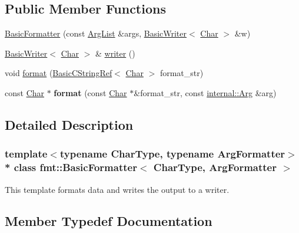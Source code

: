 \subsection*{Public Member Functions}
\begin{DoxyCompactItemize}
\item 
\hyperlink{classfmt_1_1BasicFormatter_a2b190901681ff0413dc60522fe158fdc}{Basic\+Formatter} (const \hyperlink{classfmt_1_1ArgList}{Arg\+List} \&args, \hyperlink{classfmt_1_1BasicWriter}{Basic\+Writer}$<$ \hyperlink{classfmt_1_1BasicFormatter_af8270b25395aeb82b8c72c370c5cf13a}{Char} $>$ \&w)
\item 
\hyperlink{classfmt_1_1BasicWriter}{Basic\+Writer}$<$ \hyperlink{classfmt_1_1BasicFormatter_af8270b25395aeb82b8c72c370c5cf13a}{Char} $>$ \& \hyperlink{classfmt_1_1BasicFormatter_abd5692d2f2123b27da7941d56fc6073c}{writer} ()
\item 
void \hyperlink{classfmt_1_1BasicFormatter_a63acecbbf9681005f3c7eb4d42a54bf7}{format} (\hyperlink{classfmt_1_1BasicCStringRef}{Basic\+C\+String\+Ref}$<$ \hyperlink{classfmt_1_1BasicFormatter_af8270b25395aeb82b8c72c370c5cf13a}{Char} $>$ format\+\_\+str)
\item 
const \hyperlink{classfmt_1_1BasicFormatter_af8270b25395aeb82b8c72c370c5cf13a}{Char} $\ast$ {\bfseries format} (const \hyperlink{classfmt_1_1BasicFormatter_af8270b25395aeb82b8c72c370c5cf13a}{Char} $\ast$\&format\+\_\+str, const \hyperlink{structfmt_1_1internal_1_1Arg}{internal\+::\+Arg} \&arg)\hypertarget{classfmt_1_1BasicFormatter_ab436d449f9a0678badb672af2a8ecb32}{}\label{classfmt_1_1BasicFormatter_ab436d449f9a0678badb672af2a8ecb32}

\end{DoxyCompactItemize}


\subsection{Detailed Description}
\subsubsection*{template$<$typename Char\+Type, typename Arg\+Formatter$>$\\*
class fmt\+::\+Basic\+Formatter$<$ Char\+Type, Arg\+Formatter $>$}

This template formats data and writes the output to a writer. 

\subsection{Member Typedef Documentation}

